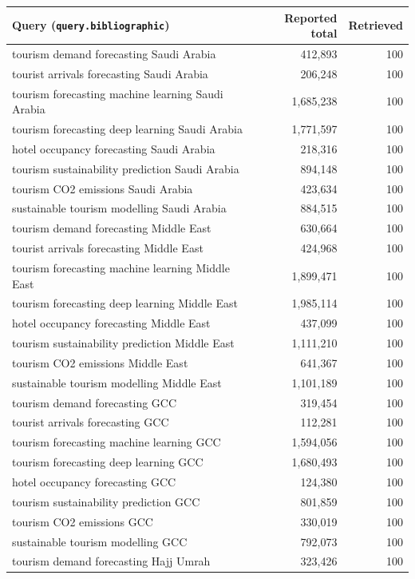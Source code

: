 \begin{longtable}{@{}p{9.2cm}rr@{}}
\toprule
Query (\texttt{query.bibliographic}) & Reported total & Retrieved\\
\midrule\endhead
tourism demand forecasting Saudi Arabia & 412,893 & 100 \\
tourist arrivals forecasting Saudi Arabia & 206,248 & 100 \\
tourism forecasting machine learning Saudi Arabia & 1,685,238 & 100 \\
tourism forecasting deep learning Saudi Arabia & 1,771,597 & 100 \\
hotel occupancy forecasting Saudi Arabia & 218,316 & 100 \\
tourism sustainability prediction Saudi Arabia & 894,148 & 100 \\
tourism CO2 emissions Saudi Arabia & 423,634 & 100 \\
sustainable tourism modelling Saudi Arabia & 884,515 & 100 \\
tourism demand forecasting Middle East & 630,664 & 100 \\
tourist arrivals forecasting Middle East & 424,968 & 100 \\
tourism forecasting machine learning Middle East & 1,899,471 & 100 \\
tourism forecasting deep learning Middle East & 1,985,114 & 100 \\
hotel occupancy forecasting Middle East & 437,099 & 100 \\
tourism sustainability prediction Middle East & 1,111,210 & 100 \\
tourism CO2 emissions Middle East & 641,367 & 100 \\
sustainable tourism modelling Middle East & 1,101,189 & 100 \\
tourism demand forecasting GCC & 319,454 & 100 \\
tourist arrivals forecasting GCC & 112,281 & 100 \\
tourism forecasting machine learning GCC & 1,594,056 & 100 \\
tourism forecasting deep learning GCC & 1,680,493 & 100 \\
hotel occupancy forecasting GCC & 124,380 & 100 \\
tourism sustainability prediction GCC & 801,859 & 100 \\
tourism CO2 emissions GCC & 330,019 & 100 \\
sustainable tourism modelling GCC & 792,073 & 100 \\
tourism demand forecasting Hajj Umrah & 323,426 & 100 \\

\end{longtable}

